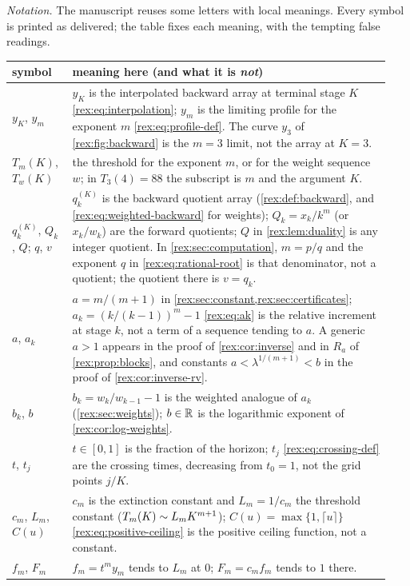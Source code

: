 \begin{writenote}
\emph{Notation.} The manuscript reuses some letters with local meanings.
Every symbol is printed as delivered; the table fixes each meaning, with the
tempting false readings.
\begin{center}\footnotesize
\begin{tabular}{@{}p{0.15\linewidth}p{0.79\linewidth}@{}}
\toprule
symbol & meaning here (and what it is \emph{not})\\
\midrule
$y_K$, $y_m$ & $y_K$ is the interpolated backward array at terminal stage $K$ \eqref{rex:eq:interpolation}; $y_m$ is the limiting profile for the exponent $m$ \eqref{rex:eq:profile-def}. The curve $y_3$ of \cref{rex:fig:backward} is the $m=3$ limit, not the array at $K=3$.\\
$T_m(K)$, $T_w(K)$ & the threshold for the exponent $m$, or for the weight sequence $w$; in $T_3(4)=88$ the subscript is $m$ and the argument $K$.\\
$q_k^{(K)}$, $Q_k$, $Q$; $q$, $v$ & $q_k^{(K)}$ is the backward quotient array (\cref{rex:def:backward}, and \eqref{rex:eq:weighted-backward} for weights); $Q_k=x_k/k^m$ (or $x_k/w_k$) are the forward quotients; $Q$ in \cref{rex:lem:duality} is any integer quotient. In \cref{rex:sec:computation}, $m=p/q$ and the exponent $q$ in \eqref{rex:eq:rational-root} is that denominator, not a quotient; the quotient there is $v=q_k$.\\
$a$, $a_k$ & $a=m/(m+1)$ in \cref{rex:sec:constant,rex:sec:certificates}; $a_k=(k/(k-1))^m-1$ \eqref{rex:eq:ak} is the relative increment at stage $k$, not a term of a sequence tending to $a$. A generic $a>1$ appears in the proof of \cref{rex:cor:inverse} and in $R_a$ of \cref{rex:prop:blocks}, and constants $a<\lambda^{1/(m+1)}<b$ in the proof of \cref{rex:cor:inverse-rv}.\\
$b_k$, $b$ & $b_k=w_k/w_{k-1}-1$ is the weighted analogue of $a_k$ (\cref{rex:sec:weights}); $b\in\mathbb R$ is the logarithmic exponent of \cref{rex:cor:log-weights}.\\
$t$, $t_j$ & $t\in[0,1]$ is the fraction of the horizon; $t_j$ \eqref{rex:eq:crossing-def} are the crossing times, decreasing from $t_0=1$, not the grid points $j/K$.\\
$c_m$, $L_m$, $C(u)$ & $c_m$ is the extinction constant and $L_m=1/c_m$ the threshold constant ($T_m(K)\mathrel{\sim} L_mK^{m+1}$); $C(u)=\max\{1,\lceil u\rceil\}$ \eqref{rex:eq:positive-ceiling} is the positive ceiling function, not a constant.\\
$f_m$, $F_m$ & $f_m=t^my_m$ tends to $L_m$ at $0$; $F_m=c_mf_m$ tends to $1$ there.\\

\end{tabular}
\end{center}
\end{writenote}
